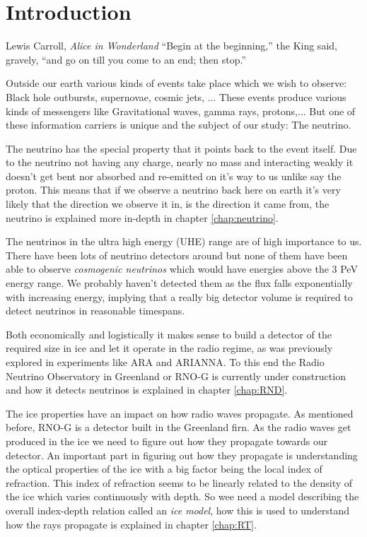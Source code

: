 \chapter*{Introduction}
\begin{chapquote}{Lewis Carroll, \textit{Alice in Wonderland}}
``Begin at the beginning,'' the King said, gravely, ``and go on till you
come to an end; then stop.''
\end{chapquote}
Outside our earth various kinds of events take place which we wish to 
observe: Black hole outbursts, supernovae, cosmic jets, ...
These events produce various kinds of messengers like 
Gravitational waves, gamma rays, protons,...
But one of these information carriers is unique and
the subject of our study: The neutrino. 

The neutrino has the special property that it points back to the event itself.
Due to the neutrino not having any charge, nearly no mass and 
interacting weakly it doesn't get bent nor absorbed and re-emitted 
on it's way to us unlike say the proton. This means that if we observe
a neutrino back here on earth it's very likely that the direction we observe
it in, is the direction it came from, the neutrino is explained more in-depth in chapter
\ref{chap:neutrino}.

The neutrinos in the ultra high energy (UHE) range are of high importance to us.
There have been lots of neutrino detectors around but none of them
have been able to observe \textit{cosmogenic neutrinos} which would have energies above
the 3 PeV energy range. We probably haven't detected them as the flux falls exponentially 
with increasing energy, implying that a really big detector volume is
required to detect neutrinos in reasonable timespans. 

Both economically and logistically it makes sense to build a detector of the
required size in ice and let it operate in the radio regime, as was previously
explored in experiments like ARA and ARIANNA.  To this end the Radio Neutrino
Observatory in Greenland or RNO-G is currently under construction and how it 
detects neutrinos is explained in chapter \ref{chap:RND}.

The ice properties have an impact on how radio waves propagate. As mentioned
before, RNO-G is a detector built in the Greenland firn. As the radio waves get
produced in the ice we need to figure out how they propagate towards our
detector. An important part in figuring out how they propagate is understanding
the optical properties of the ice with a big factor being the local index of
refraction. This index of refraction seems to be linearly related to the density of the ice which
varies continuously with depth. So wee need a model describing the overall index-depth relation
called an \textit{ice model}, how this is used to understand how the rays propagate
is explained in chapter \ref{chap:RT}.

